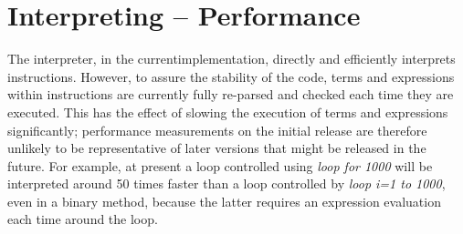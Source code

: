 \section{Interpreting -- Performance}
The interpreter, in the currentimplementation, directly and efficiently interprets \nr{}
instructions.  However, to assure the stability of the code, terms and
expressions within instructions are currently fully re-parsed and
checked each time they are executed.  This has the effect of slowing the
execution of terms and expressions significantly; performance
measurements on the initial release are therefore unlikely to be
representative of later versions that might be released in the future.
\newline
For example, at present a loop controlled using \emph{loop for
1000} will be interpreted around 50 times faster than a loop
controlled by \emph{loop i=1 to 1000}, even in a binary method,
because the latter requires an expression evaluation each time around
the loop.

